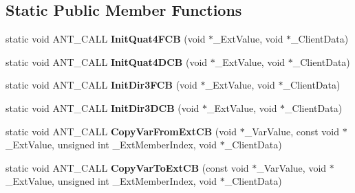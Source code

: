\subsection*{Static Public Member Functions}
\begin{DoxyCompactItemize}
\item 
\hypertarget{struct_c_quaternion_ext_a20ac6106eb9934c0c3a1f8bd9148f696}{static void A\+N\+T\+\_\+\+C\+A\+L\+L {\bfseries Init\+Quat4\+F\+C\+B} (void $\ast$\+\_\+\+Ext\+Value, void $\ast$\+\_\+\+Client\+Data)}\label{struct_c_quaternion_ext_a20ac6106eb9934c0c3a1f8bd9148f696}

\item 
\hypertarget{struct_c_quaternion_ext_a8f7ca8069432d315ae2e80774d163400}{static void A\+N\+T\+\_\+\+C\+A\+L\+L {\bfseries Init\+Quat4\+D\+C\+B} (void $\ast$\+\_\+\+Ext\+Value, void $\ast$\+\_\+\+Client\+Data)}\label{struct_c_quaternion_ext_a8f7ca8069432d315ae2e80774d163400}

\item 
\hypertarget{struct_c_quaternion_ext_aeebc762f035f76d27c083279746ec06c}{static void A\+N\+T\+\_\+\+C\+A\+L\+L {\bfseries Init\+Dir3\+F\+C\+B} (void $\ast$\+\_\+\+Ext\+Value, void $\ast$\+\_\+\+Client\+Data)}\label{struct_c_quaternion_ext_aeebc762f035f76d27c083279746ec06c}

\item 
\hypertarget{struct_c_quaternion_ext_ad62ecd534ac09e1e68092da3e8e90d11}{static void A\+N\+T\+\_\+\+C\+A\+L\+L {\bfseries Init\+Dir3\+D\+C\+B} (void $\ast$\+\_\+\+Ext\+Value, void $\ast$\+\_\+\+Client\+Data)}\label{struct_c_quaternion_ext_ad62ecd534ac09e1e68092da3e8e90d11}

\item 
\hypertarget{struct_c_quaternion_ext_af6b7a02f470329529fb6e61170f74fa8}{static void A\+N\+T\+\_\+\+C\+A\+L\+L {\bfseries Copy\+Var\+From\+Ext\+C\+B} (void $\ast$\+\_\+\+Var\+Value, const void $\ast$\+\_\+\+Ext\+Value, unsigned int \+\_\+\+Ext\+Member\+Index, void $\ast$\+\_\+\+Client\+Data)}\label{struct_c_quaternion_ext_af6b7a02f470329529fb6e61170f74fa8}

\item 
\hypertarget{struct_c_quaternion_ext_a04885b65aa78d9db8a74d0de3eeb0033}{static void A\+N\+T\+\_\+\+C\+A\+L\+L {\bfseries Copy\+Var\+To\+Ext\+C\+B} (const void $\ast$\+\_\+\+Var\+Value, void $\ast$\+\_\+\+Ext\+Value, unsigned int \+\_\+\+Ext\+Member\+Index, void $\ast$\+\_\+\+Client\+Data)}\label{struct_c_quaternion_ext_a04885b65aa78d9db8a74d0de3eeb0033}


\end{DoxyCompactItemize}

